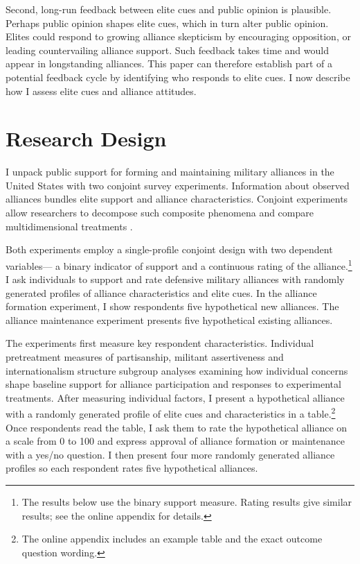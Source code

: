 \documentclass[12pt]{article}
\begin{document}
Second, long-run feedback between elite cues and public opinion is plausible. 
Perhaps public opinion shapes elite cues, which in turn alter public opinion. 
Elites could respond to growing alliance skepticism by encouraging opposition, or leading countervailing alliance support.
Such feedback takes time and would appear in longstanding alliances.
This paper can therefore establish part of a potential feedback cycle by identifying who responds to elite cues.  
I now describe how I assess elite cues and alliance attitudes. 



\section{Research Design}



I unpack public support for forming and maintaining military alliances in the United States with two conjoint survey experiments. 
Information about observed alliances bundles elite support and alliance characteristics. 
Conjoint experiments allow researchers to decompose such composite phenomena and compare multidimensional treatments \citep{Hainmuelleretal2014}. 


Both experiments employ a single-profile conjoint design with two dependent variables--- a binary indicator of support and a continuous rating of the alliance.\footnote{The results below use the binary support measure. Rating results give similar results; see the online appendix for details.} 
I ask individuals to support and rate defensive military alliances with randomly generated profiles of alliance characteristics and elite cues. 
In the alliance formation experiment, I show respondents five hypothetical new alliances. 
The alliance maintenance experiment presents five hypothetical existing alliances.


The experiments first measure key respondent characteristics.  
Individual pretreatment measures of partisanship, militant assertiveness and internationalism structure subgroup analyses examining how individual concerns shape baseline support for alliance participation and responses to experimental treatments. 
After measuring individual factors, I present a hypothetical alliance with a randomly generated profile of elite cues and characteristics in a table.\footnote{The online appendix includes an example table and the exact outcome question wording.} 
Once respondents read the table, I ask them to rate the hypothetical alliance on a scale from 0 to 100 and express approval of alliance formation or maintenance with a yes/no question. 
I then present four more randomly generated alliance profiles so each respondent rates five hypothetical alliances.
\end{document}
